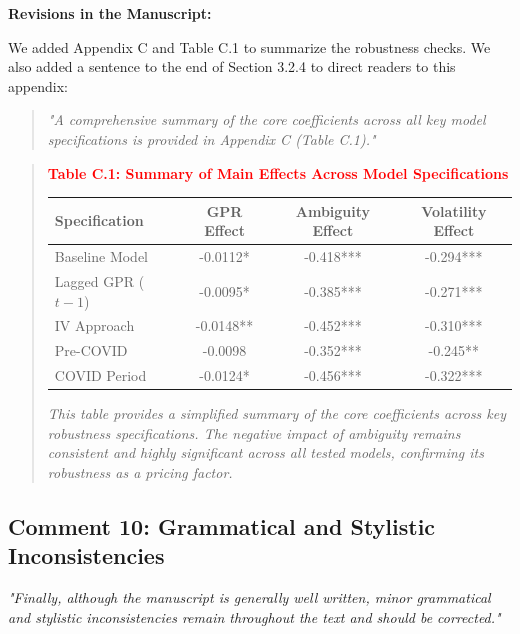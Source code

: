 \documentclass[12pt]{article}
\begin{document}
\begin{highlightbox}
\textbf{Revisions in the Manuscript:}

We added Appendix C and Table C.1 to summarize the robustness checks. We also added a sentence to the end of Section 3.2.4 to direct readers to this appendix:
\vspace{0.1 cm}
\begin{quote}
\color{red}\itshape "A comprehensive summary of the core coefficients across all key model specifications is provided in Appendix C (Table C.1)."
\end{quote} 
\vspace{0.15 cm}
\begin{quote}
\color{red}\itshape
\begin{center}
\centering
\textbf{\textcolor{red}{Table C.1: Summary of Main Effects Across Model Specifications}}
\color{red}\itshape
\begin{tabular}{lccc}
\hline
Specification & GPR Effect & Ambiguity Effect & Volatility Effect \\
\hline
Baseline Model & -0.0112* & -0.418*** & -0.294*** \\
Lagged GPR ($t-1$) & -0.0095* & -0.385*** & -0.271*** \\
IV Approach & -0.0148** & -0.452*** & -0.310*** \\
Pre-COVID & -0.0098 & -0.352*** & -0.245** \\
COVID Period & -0.0124* & -0.456*** & -0.322*** \\
\hline
\end{tabular}
\end{center}
\color{red}\itshape This table provides a simplified summary of the core coefficients across key robustness specifications. The negative impact of ambiguity remains consistent and highly significant across all tested models, confirming its robustness as a pricing factor.

\end{quote}
\end{highlightbox}

\subsection*{Comment 10: Grammatical and Stylistic Inconsistencies}
\textit{"Finally, although the manuscript is generally well written, minor grammatical and stylistic inconsistencies remain throughout the text and should be corrected."}
\end{document}
